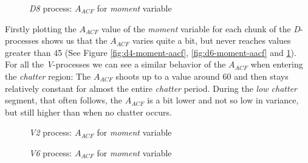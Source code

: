 \documentclass[12 pt]{scrartcl}
\begin{document}
\begin{figure}[p]
  \caption{\emph{D8} process: $A_{ACF}$ for \emph{moment} variable}
  \label{fig:d8-moment-aacf}
\end{figure}

Firstly plotting the $A_{ACF}$ value of the \emph{moment} variable for each chunk of the \emph{D}-processes shows us that the $A_{ACF}$ varies quite a bit, but never reaches values greater than 45 (See Figure \ref{fig:d4-moment-aacf}, \ref{fig:d6-moment-aacf} and \ref{fig:d8-moment-aacf}). For all the \emph{V}-processes we can see a similar behavior of the $A_{ACF}$ when entering the \emph{chatter} region: The $A_{ACF}$ shoots up to a value around 60 and then stays relatively constant for almost the entire \emph{chatter} period. During the \emph{low chatter} segment, that often follows, the $A_{ACF}$ is a bit lower and not so low in variance, but still higher than when no chatter occurs.

\begin{figure}[H]
  \caption{\emph{V2} process: $A_{ACF}$ for \emph{moment} variable}
  \label{fig:v2-moment-aacf}
\end{figure}



\begin{figure}[H]
  \caption{\emph{V6} process: $A_{ACF}$ for \emph{moment} variable}
  \label{fig:v6-moment-aacf}
\end{figure}
\end{document}
